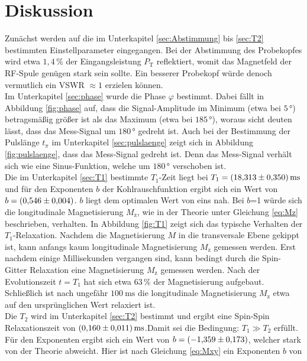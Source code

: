 \section{Diskussion}
\label{sec:Diskussion}
Zunächst werden auf die im Unterkapitel \ref{sec:Abstimmung} bis \ref{sec:T2}
bestimmten Einstellparameter eingegangen.
Bei der Abstimmung des Probekopfes wird etwa $1,4\,\%$ der Eingangsleistung
$P_{\text{T}}$ reflektiert, womit das Magnetfeld der RF-Spule genügen stark sein
sollte. Ein besserer Probekopf würde denoch vermutlich ein VSWR $\approx1$ erzielen
können.\\
Im Unterkapitel \ref{sec:phase} wurde die Phase $\varphi$ bestimmt. Dabei fällt
in Abbildung \ref{fig:phase} auf, dass die Signal-Amplitude im Minimum (etwa bei $5\,°$)
betragsmäßig größer ist als das Maximum (etwa bei $185\,°$), woraus sicht deuten
lässt, dass das Mess-Signal um $180\,°$ gedreht ist.
Auch bei der Bestimmung der Pulslänge $t_{\pi}$ im Unterkapitel \ref{sec:pulslaenge}
zeigt sich in Abbildung \ref{fig:pulslaenge}, dass das Mess-Signal gedreht ist.
Denn das Mess-Signal verhält sich wie eine Sinus-Funktion, welche um $180\,°$
verschoben ist.\\
Die im Unterkapitel \ref{sec:T1} bestimmte $T_1$-Zeit liegt bei
$T_1 = \SI{18.313\pm0.350}{\milli\second}$ und für den Exponenten $b$ der
Kohlrauschfunktion ergibt sich ein Wert von $b = \SI{0,546\pm0,004}{}$. $b$ liegt
dem optimalen Wert von eins nah. Bei $b$=1 würde sich die longitudinale
Magnetisierung $M_{\text{z}}$, wie in der Theorie unter Gleichung \ref{eq:Mz}
beschrieben, verhalten. In Abbildung \ref{fig:T1} zeigt sich das typische Verhalten
der $T_1$-Relaxation. Nachdem die Magnetisierung $M$ in die transversale Ebene gekippt ist,
kann anfangs kaum longitudinale Magnetisierung $M_{\text{z}}$ gemessen werden.
Erst nachdem einige Millisekunden vergangen sind, kann bedingt durch die Spin-Gitter
Relaxation eine Magnetisierung $M_{\text{z}}$ gemessen werden. Nach der Evolutionszeit
$t=T_1$ hat sich etwa $63\,\%$ der Magnetisierung aufgebaut. Schließlich ist nach
ungefähr $\SI{100}{\milli\second}$ die longitudinale Magnetisierung $M_{\text{z}}$
etwa auf den ursprünglichen Wert relaxiert ist.\\
Die $T_2$ wird im Unterkapitel \ref{sec:T2} bestimmt und ergibt eine Spin-Spin
Relaxationszeit von $\SI{0.160\pm0.011}{\milli\second}$.Damit sei die Bedingung:
$T_1 \gg T_2$ erfüllt.
Für den Exponenten ergibt sich ein Wert von $b = \SI{-1,359\pm0,173}{}$, welcher
stark von der Theorie abweicht. Hier ist nach Gleichung \ref{eq:Mxy} ein Exponenten $b$ von

